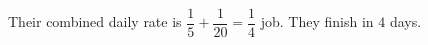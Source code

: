 Their combined daily rate is $\dfrac{1}{5}+\dfrac{1}{20}=\dfrac{1}{4}$ job. They finish in $\boxed4 $ days.

